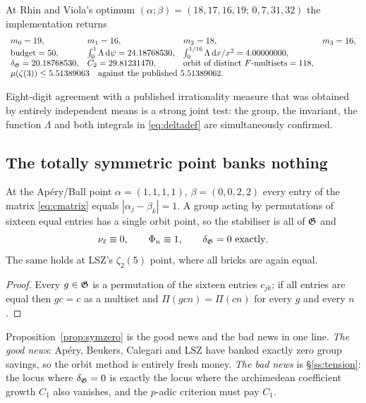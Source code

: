\begin{finding}\label{find:rvvalidation}
 At Rhin and
Viola's optimum $(\alpha;\beta)=(18,17,16,19;\,0,7,31,32)$ the implementation returns
\[
\begin{array}{llll}
 m_0=19,& m_1=16,& m_2=18,& m_3=16,\\
 \bud=50, & \int_0^1\Lambda\,\dd\psi=24.18768530, & \int_0^{1/16}\Lambda\,\dd x/x^2=4.00000000, &\\
 \dgr=20.18768530, & C_2=29.81231470, & \text{orbit of distinct }F\text{-multisets}=118, &\\
 \multicolumn{4}{l}{\mu(\zeta(3))\le5.51389063\quad\text{against the published }5.51389062 .}
\end{array}
\]
\end{finding}

Eight-digit agreement with a published irrationality measure that was obtained by entirely
independent means is a strong joint test: the group, the invariant, the function $\Lambda$
and both integrals in \eqref{eq:deltadef} are simultaneously confirmed.

\subsection{The totally symmetric point banks nothing}\label{ss:symzero}

\begin{proposition}\label{prop:symzero}
\PROVED{} At the Ap\'ery/Ball point $\alpha=(1,1,1,1)$, $\beta=(0,0,2,2)$ every entry of the
matrix \eqref{eq:cmatrix} equals $|\alpha_j-\beta_k|=1$. A group acting by permutations of
sixteen equal entries has a single orbit point, so the stabiliser is all of $\mathfrak{G}$ and
\[
 \nu_\ell\equiv0,\qquad \Phi_n\equiv1,\qquad \delta_{\mathfrak{G}}=0\ \text{exactly}.
\]
The same holds at LSZ's $\zeta_2(5)$ point, where all bricks are again equal.
\end{proposition}

\begin{proof}
Every $g\in\mathfrak{G}$ is a permutation of the sixteen entries $c_{jk}$; if all entries are equal
then $gc=c$ as a multiset and $\Pi(gcn)=\Pi(cn)$ for every $g$ and every $n$.
\end{proof}

Proposition~\ref{prop:symzero} is the good news and the bad news in one line.
\emph{The good news}: Ap\'ery, Beukers, Calegari and LSZ have banked exactly zero group
savings, so the orbit method is entirely fresh money. \emph{The bad news} is
\S\ref{ss:tension}: the locus where $\delta_{\mathfrak{G}}=0$ is exactly the locus where the archimedean
coefficient growth $C_1$ also vanishes, and the $p$-adic criterion must pay $C_1$.

